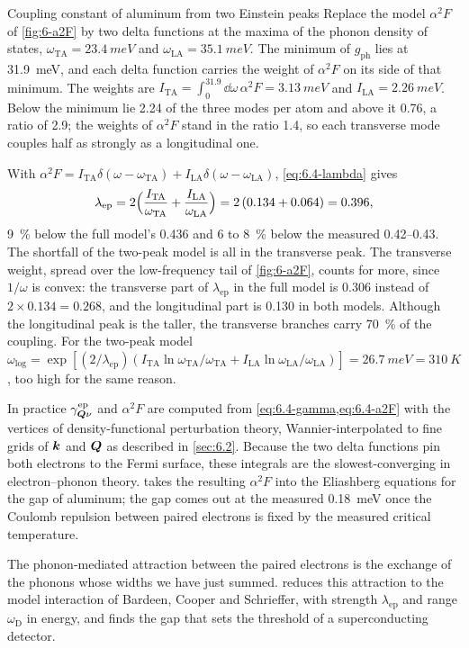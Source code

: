 \begin{workedexample}{Coupling constant of aluminum from two Einstein peaks}\label{we:6-al}
Replace the model $\alpha^2F$ of \cref{fig:6-a2F} by two delta functions at the maxima of the phonon density of states, $\omega_{\mathrm{TA}} = \SI{23.4}{meV}$ and $\omega_{\mathrm{LA}} = \SI{35.1}{meV}$. The minimum of $g_{\mathrm{ph}}$ lies at \SI{31.9}{meV}, and each delta function carries the weight of $\alpha^2F$ on its side of that minimum. The weights are $I_{\mathrm{TA}} = \int_0^{31.9}\dd\omega\,\alpha^2F = \SI{3.13}{meV}$ and $I_{\mathrm{LA}} = \SI{2.26}{meV}$. Below the minimum lie 2.24 of the three modes per atom and above it 0.76, a ratio of 2.9; the weights of $\alpha^2F$ stand in the ratio 1.4, so each transverse mode couples half as strongly as a longitudinal one.

With $\alpha^2F = I_{\mathrm{TA}}\delta(\omega - \omega_{\mathrm{TA}}) + I_{\mathrm{LA}}\delta(\omega - \omega_{\mathrm{LA}})$, \cref{eq:6.4-lambda} gives
\begin{equation*}
  \lambda_{\mathrm{ep}} = 2\Bigl(\frac{I_{\mathrm{TA}}}{\omega_{\mathrm{TA}}} + \frac{I_{\mathrm{LA}}}{\omega_{\mathrm{LA}}}\Bigr) = 2\,(0.134 + 0.064) = 0.396 ,
\end{equation*}
\SI{9}{\percent} below the full model's 0.436 and 6 to \SI{8}{\percent} below the measured 0.42--0.43. The shortfall of the two-peak model is all in the transverse peak. The transverse weight, spread over the low-frequency tail of \cref{fig:6-a2F}, counts for more, since $1/\omega$ is convex: the transverse part of $\lambda_{\mathrm{ep}}$ in the full model is 0.306 instead of $2\times0.134 = 0.268$, and the longitudinal part is 0.130 in both models. Although the longitudinal peak is the taller, the transverse branches carry \SI{70}{\percent} of the coupling. For the two-peak model $\omega_{\log} = \exp[(2/\lambda_{\mathrm{ep}})(I_{\mathrm{TA}}\ln\omega_{\mathrm{TA}}/\omega_{\mathrm{TA}} + I_{\mathrm{LA}}\ln\omega_{\mathrm{LA}}/\omega_{\mathrm{LA}})] = \SI{26.7}{meV} = \SI{310}{K}$, too high for the same reason.
\end{workedexample}

In practice $\gamma^{\mathrm{ep}}_{\bm{Q}\nu}$ and $\alpha^2F$ are computed from \cref{eq:6.4-gamma,eq:6.4-a2F} with the vertices of density-functional perturbation theory, Wannier-interpolated to fine grids of $\bm{k}$ and $\bm{Q}$ as described in \cref{sec:6.2}. Because the two delta functions pin both electrons to the Fermi surface, these integrals are the slowest-converging in electron--phonon theory.  takes the resulting $\alpha^2F$ into the Eliashberg equations for the gap of aluminum; the gap comes out at the measured \SI{0.18}{meV} once the Coulomb repulsion between paired electrons is fixed by the measured critical temperature.

The phonon-mediated attraction between the paired electrons is the exchange of the phonons whose widths we have just summed.  reduces this attraction to the model interaction of Bardeen, Cooper and Schrieffer, with strength $\lambda_{\mathrm{ep}}$ and range $\omega_{\mathrm{D}}$ in energy, and finds the gap that sets the threshold of a superconducting detector.
